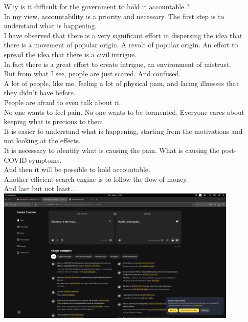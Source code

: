 \documentclass[11pt]{book}
\begin{document}
\noindent Why is it difficult for the government to hold it accountable ? \\

\noindent In my view, accountability is a priority and necessary. The first step is to understand what is happening. \\

\noindent I have observed that there is a very significant effort in dispersing the idea that there is a movement of popular origin. A revolt of popular origin. An effort to spread the idea that there is a civil intrigue. \\

\noindent In fact there is a great effort to create intrigue, an environment of mistrust. \\

\noindent But from what I see, people are just scared. And confused. \\

\noindent A lot of people, like me, feeling a lot of physical pain, and facing illnesses that they didn't have before. \\

\noindent People are afraid to even talk about it. \\

\noindent No one wants to feel pain. No one wants to be tormented. Everyone cares about keeping what is precious to them. \\

\noindent It is easier to understand what is happening, starting from the motivations and not looking at the effects. \\

\noindent It is necessary to identify what is causing the pain. What is causing the post-COVID symptoms. \\

\noindent And then it will be possible to hold accountable. \\

\noindent Another efficient search engine is to follow the flow of money. \\

\noindent And last but not least... \\

\includegraphics[width=0.9\textwidth]{figures/Screenshot from 2024-08-04 02.07.22.png} \\
\end{document}
